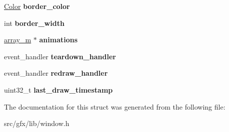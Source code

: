 \begin{DoxyCompactItemize}
\hyperlink{structcolor}{Color} {\bfseries border\+\_\+color}
\item 
\mbox{\label{structwindow_a003634fcee9c497c3209510c2586fa19}} 
int {\bfseries border\+\_\+width}
\item 
\mbox{\label{structwindow_ad95d50f92fa1bc32ba13807dd26e76b7}} 
\hyperlink{structarray__m}{array\+\_\+m} $\ast$ {\bfseries animations}
\item 
\mbox{\label{structwindow_af89037a59b004887db1544adfe17709c}} 
event\+\_\+handler {\bfseries teardown\+\_\+handler}
\item 
\mbox{\label{structwindow_a14d25268b9cb7af5e6a4e148b384bd0e}} 
event\+\_\+handler {\bfseries redraw\+\_\+handler}
\item 
\mbox{\label{structwindow_a0d651c3f26489cae594ee9348b81da7f}} 
uint32\+\_\+t {\bfseries last\+\_\+draw\+\_\+timestamp}
\end{DoxyCompactItemize}


The documentation for this struct was generated from the following file\+:\begin{DoxyCompactItemize}
\item 
src/gfx/lib/window.\+h\end{DoxyCompactItemize}
